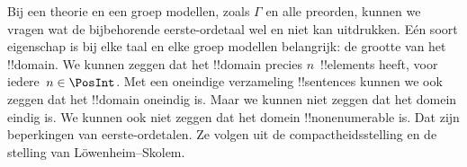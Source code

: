 \documentclass[../../../include/open-logic-section]{subfiles}
\begin{document}
Bij een theorie en een groep modellen, zoals $\Gamma$ en alle
preorden, kunnen we vragen wat de bijbehorende eerste-ordetaal wel en
niet kan uitdrukken. Eén soort eigenschap is bij elke taal en elke
groep modellen belangrijk: de grootte van het !!{domain}. We kunnen
zeggen dat het !!{domain} precies $n$~!!{element}s heeft, voor
iedere~$n \in \PosInt$. Met een oneindige verzameling !!{sentence}s
kunnen we ook zeggen dat het !!{domain} oneindig is. Maar we kunnen
niet zeggen dat het domein eindig is. We kunnen ook niet zeggen dat het
domein !!{nonenumerable} is. Dat zijn beperkingen van eerste-ordetalen.
Ze volgen uit de compactheidsstelling en de stelling van
L\"owenheim--Skolem.
\end{document}
